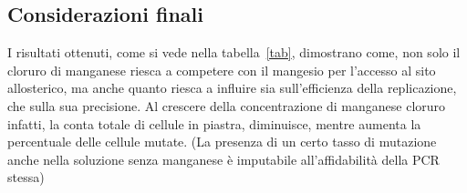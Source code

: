 	\subsection*{Considerazioni finali}
	I risultati ottenuti, come si vede nella tabella~\ref{tab}, dimostrano come, non solo il cloruro di manganese riesca a competere con il mangesio per l'accesso al sito allosterico,
        ma anche quanto riesca a influire sia sull'efficienza della replicazione, che sulla sua precisione.
        Al crescere della concentrazione di manganese cloruro infatti, la conta totale di cellule in piastra, diminuisce, mentre aumenta la percentuale delle cellule mutate.
        (La presenza di un certo tasso di mutazione anche nella soluzione senza manganese è imputabile all'affidabilità della PCR stessa)

